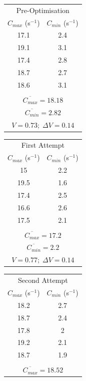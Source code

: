 \documentclass[10pt,a4paper]{article}
\begin{document}
\begin{table}[H]
\centering
\begin{tabular}{|c|c|}
\hline
\multicolumn{2}{|c|}{Pre-Optimisation}\\
$C_{max}$ (s$^{-1}$) & $C_{min}$ (s$^{-1}$)\\
\hline
17.1 & 2.4 \\
19.1 & 3.1 \\
17.4 & 2.8 \\
18.7 & 2.7 \\
18.6 & 3.1 \\
\hline
\multicolumn{2}{|c|}{}\\[-2mm]
\multicolumn{2}{|c|}{$\overline{C_{max}} = 18.18$}\\
\multicolumn{2}{|c|}{$\overline{C_{min}} = 2.82$}\\
\multicolumn{2}{|c|}{$V = 0.73;\; \Delta V = 0.14$}\\
\hline
\end{tabular}
\begin{tabular}{|c|c|}
\hline
\multicolumn{2}{|c|}{First Attempt}\\
$C_{max}$ (s$^{-1}$) & $C_{min}$ (s$^{-1}$)\\
\hline
15 & 2.2 \\
19.5 & 1.6 \\
17.4 & 2.5 \\
16.6 & 2.6 \\
17.5 & 2.1 \\
\hline
\multicolumn{2}{|c|}{}\\[-2mm]
\multicolumn{2}{|c|}{$\overline{C_{max}} = 17.2$}\\
\multicolumn{2}{|c|}{$\overline{C_{min}} = 2.2$}\\
\multicolumn{2}{|c|}{$V = 0.77;\; \Delta V = 0.14$}\\
\hline
\end{tabular}
\begin{tabular}{|c|c|}
\hline
\multicolumn{2}{|c|}{Second Attempt}\\
$C_{max}$ (s$^{-1}$) & $C_{min}$ (s$^{-1}$)\\
\hline
18.2 & 2.7 \\
18.7 & 2.4 \\
17.8 & 2 \\
19.2 & 2.1 \\
18.7 & 1.9 \\
\hline
\multicolumn{2}{|c|}{}\\[-2mm]
\multicolumn{2}{|c|}{$\overline{C_{max}} = 18.52$}\\

\end{tabular}
\end{table}
\end{document}
